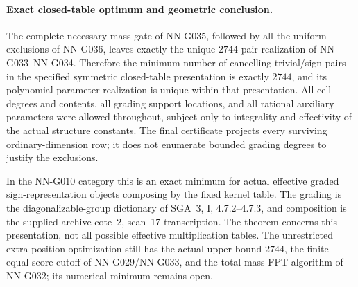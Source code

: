 \paragraph{Exact closed-table optimum and geometric conclusion.}
The complete necessary mass gate of NN-G035,
followed by all the uniform exclusions of NN-G036,
leaves exactly the unique $2744$-pair realization
of NN-G033--NN-G034. Therefore the minimum number
of cancelling trivial/sign pairs in the specified
symmetric closed-table presentation is exactly
$2744$, and its polynomial parameter realization
is unique within that presentation.
All cell degrees and contents, all grading support
locations, and all rational auxiliary parameters
were allowed throughout, subject only to integrality
and effectivity of the actual structure constants.
The final certificate projects every surviving
ordinary-dimension row; it does not enumerate
bounded grading degrees to justify the exclusions.

In the NN-G010 category this is an exact minimum
for actual effective graded sign-representation
objects composing by the fixed kernel table.
The grading is the diagonalizable-group dictionary
of SGA~3, I, 4.7.2--4.7.3, and composition is
the supplied archive cote~2, scan~17 transcription.
The theorem concerns this presentation, not all
possible effective multiplication tables.
The unrestricted extra-position optimization still
has the actual upper bound $2744$, the finite
equal-score cutoff of NN-G029/NN-G033, and the
total-mass FPT algorithm of NN-G032; its numerical
minimum remains open.

